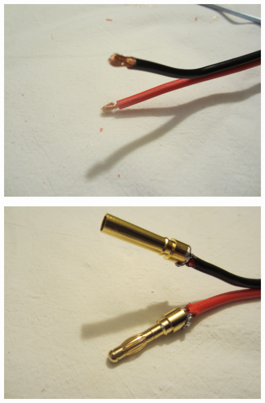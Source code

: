 \documentclass[12pt, a4paper,twoside]{tesi_upf}
\begin{document}
\begin{minipage}{0.5\textwidth}
  \centering
  \includegraphics[width=0.8\linewidth]{Images/Mounting/IMG_0385.jpg}
  \label{fig:app1}
\end{minipage}%
\begin{minipage}{0.5\textwidth}
  \centering
  \includegraphics[width=0.8\linewidth]{Images/Mounting/IMG_0390.jpg}
  \label{fig:app2}
\end{minipage}
\\[12pt]
\end{document}
